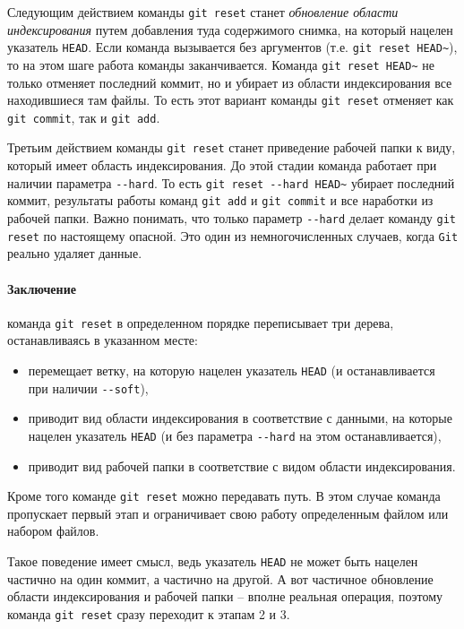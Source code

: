 \documentclass[%
	11pt,
	a4paper,
	utf8,
		]{article}
\begin{document}
Следующим действием команды \texttt{git reset} станет \emph{обновление области индексирования} путем добавления туда содержимого снимка, на который нацелен указатель \texttt{HEAD}. Если команда вызывается без аргументов (т.е. \texttt{git reset HEAD\~}), то на этом шаге работа команды заканчивается. Команда \texttt{git reset HEAD\~} не только отменяет последний коммит, но и убирает из области индексирования все находившиеся там файлы. То есть этот вариант команды \texttt{git reset} отменяет как \texttt{git commit}, так и \texttt{git add}.

Третьим действием команды \texttt{git reset} станет приведение рабочей папки к виду, который имеет область индексирования. До этой стадии команда работает при наличии параметра \verb|--hard|. То есть \verb|git reset --hard HEAD~| убирает последний коммит, результаты работы команд \texttt{git add} и \texttt{git commit} и все наработки из рабочей папки. Важно понимать, что только параметр \verb|--hard| делает команду \texttt{git reset} по настоящему опасной. Это один из немногочисленных случаев, когда \texttt{Git} реально удаляет данные. 

\paragraph{Заключение} команда \texttt{git reset} в определенном порядке переписывает три дерева, останавливаясь в указанном месте:
\begin{itemize}
	\item перемещает ветку, на которую нацелен указатель \texttt{HEAD} (и останавливается при наличии \verb|--soft|),
	
	\item приводит вид области индексирования в соответствие с данными, на которые нацелен указатель \texttt{HEAD} (и без параметра \verb|--hard| на этом останавливается),
	
	\item приводит вид рабочей папки в соответствие с видом области индексирования.
\end{itemize}

Кроме того команде \texttt{git reset} можно передавать путь. В этом случае команда пропускает первый этап и ограничивает свою работу определенным файлом или набором файлов.

Такое поведение имеет смысл, ведь указатель \texttt{HEAD} не может быть нацелен частично на один коммит, а частично на другой. А вот частичное обновление области индексирования и рабочей папки -- вполне реальная операция, поэтому команда \texttt{git reset} сразу переходит к этапам 2 и 3.
\end{document}
